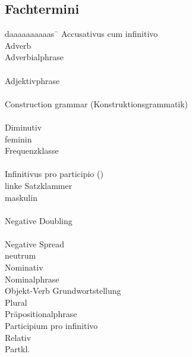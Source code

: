 \subsection*{Fachtermini}
\begin{tabbing}
daaaaaaaaaas\qquad\ \= \kill
{} \>  Accusativus cum infinitivo\\
 \> Adverb\\
 \> Adverbialphrase\\%
 \> \\
 \> Adjektivphrase\\
 \> \\
 \>  Construction grammar (Konstruktionsgrammatik)\\
 \> \\
 \> Diminutiv\\
 \> feminin\\
 \> Frequenzklasse\\
 \> \\
 \> Infinitivus pro participio ()\\
 \> linke Satzklammer\\
 \> maskulin\\
 \> \\
 \> Negative Doubling\\
 \> \\
 \> Negative Spread\\
 \> neutrum\\
 \> Nominativ\\
 \> Nominalphrase\\
 \> Objekt-Verb Grundwortstellung\\
 \> Plural\\
 \> Pr\"apositionalphrase\\
 \> Participium pro infinitivo\\
 \> Relativ\\
Partkl. \> \\

\end{tabbing}

